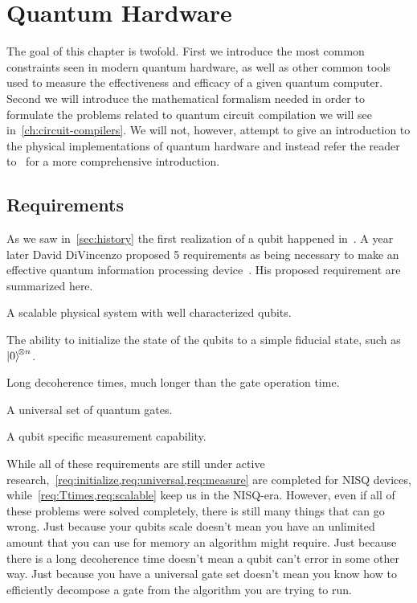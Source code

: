 \chapter{Quantum Hardware}\label{chap:hardware}

The goal of this chapter is twofold.
First we introduce the most common constraints seen in modern quantum hardware, as well as other common tools used to measure the effectiveness and efficacy of a given quantum computer.
Second we will introduce the mathematical formalism needed in order to formulate the problems related to quantum circuit compilation we will see in~\cref{ch:circuit-compilers}.
We will not, however, attempt to give an introduction to the physical implementations of quantum hardware and instead refer the reader to~\cite{nielsenchuang} for a more comprehensive introduction.

\section{Requirements}
As we saw in~\cref{sec:history} the first realization of a qubit happened in~\citeyear{firstqubit}.
A year later David DiVincenzo proposed 5 requirements as being necessary to make an effective quantum information processing device~\cite{divincenzo}.
His proposed requirement are summarized here.
\begin{requirements}
    \item A scalable physical system with well characterized qubits.\label{req:scalable}
    \item The ability to initialize the state of the qubits to a simple fiducial state, such as $\ket{0}^{\!\otimes n}$.\label{req:initialize}
    \item Long decoherence times, much longer than the gate operation time.\label{req:Ttimes}
    \item A universal set of quantum gates.\label{req:universal}
    \item A qubit specific measurement capability.\label{req:measure}
\end{requirements}
While all of these requirements are still under active research,~\cref{req:initialize,req:universal,req:measure} are completed for \ac{NISQ} devices, while~\cref{req:Ttimes,req:scalable} keep us in the \ac{NISQ}-era.
However, even if all of these problems were solved completely, there is still many things that can go wrong.
Just because your qubits scale doesn't mean you have an unlimited amount that you can use for memory an algorithm might require.
Just because there is a long decoherence time doesn't mean a qubit can't error in some other way.
Just because you have a universal gate set doesn't mean you know how to efficiently decompose a gate from the algorithm you are trying to run.

